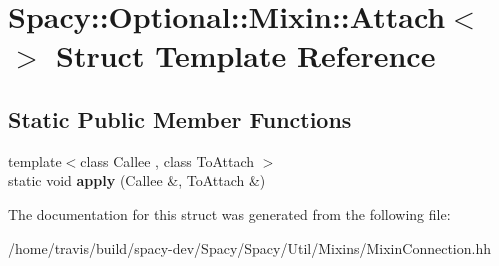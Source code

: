 \hypertarget{structSpacy_1_1Optional_1_1Mixin_1_1Attach_3_4}{\section{Spacy\-:\-:Optional\-:\-:Mixin\-:\-:Attach$<$$>$ Struct Template Reference}
\label{structSpacy_1_1Optional_1_1Mixin_1_1Attach_3_4}
}
\subsection*{Static Public Member Functions}
\begin{DoxyCompactItemize}
\item 
\hypertarget{structSpacy_1_1Optional_1_1Mixin_1_1Attach_3_4_ae78568d36f4b9ee4ece2c501880fc894}{{\footnotesize template$<$class Callee , class To\-Attach $>$ }\\static void {\bfseries apply} (Callee \&, To\-Attach \&)}\label{structSpacy_1_1Optional_1_1Mixin_1_1Attach_3_4_ae78568d36f4b9ee4ece2c501880fc894}

\end{DoxyCompactItemize}


The documentation for this struct was generated from the following file\-:\begin{DoxyCompactItemize}
\item 
/home/travis/build/spacy-\/dev/\-Spacy/\-Spacy/\-Util/\-Mixins/Mixin\-Connection.\-hh\end{DoxyCompactItemize}
